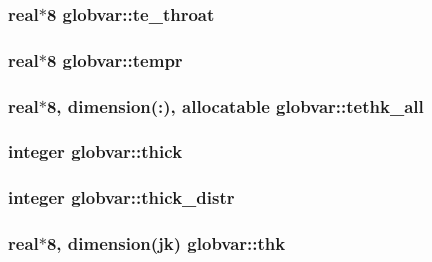\subsubsection[{te\+\_\+throat}]{\setlength{\rightskip}{0pt plus 5cm}real$\ast$8 globvar\+::te\+\_\+throat}\label{namespaceglobvar_a9eef0dca95de0a13eb716ae8aef154c5}
\hypertarget{namespaceglobvar_a6952feddb2848759567dd3a4a3f464b8}{}
\subsubsection[{tempr}]{\setlength{\rightskip}{0pt plus 5cm}real$\ast$8 globvar\+::tempr}\label{namespaceglobvar_a6952feddb2848759567dd3a4a3f464b8}
\hypertarget{namespaceglobvar_a0e616405e514a293d4730e14ff716027}{}
\subsubsection[{tethk\+\_\+all}]{\setlength{\rightskip}{0pt plus 5cm}real$\ast$8, dimension(\+:), allocatable globvar\+::tethk\+\_\+all}\label{namespaceglobvar_a0e616405e514a293d4730e14ff716027}
\hypertarget{namespaceglobvar_afed76bd4905177b5881960ecfcc1e706}{}
\subsubsection[{thick}]{\setlength{\rightskip}{0pt plus 5cm}integer globvar\+::thick}\label{namespaceglobvar_afed76bd4905177b5881960ecfcc1e706}
\hypertarget{namespaceglobvar_a025b952856d8a23aaaf7b150c59fd537}{}
\subsubsection[{thick\+\_\+distr}]{\setlength{\rightskip}{0pt plus 5cm}integer globvar\+::thick\+\_\+distr}\label{namespaceglobvar_a025b952856d8a23aaaf7b150c59fd537}
\hypertarget{namespaceglobvar_a72f67f1398b816e48706e6277e566566}{}
\subsubsection[{thk}]{\setlength{\rightskip}{0pt plus 5cm}real$\ast$8, dimension({\bf jk}) globvar\+::thk}\label{namespaceglobvar_a72f67f1398b816e48706e6277e566566}
\hypertarget{namespaceglobvar_a82469b82bd578f446472dd30088714f0}{}
